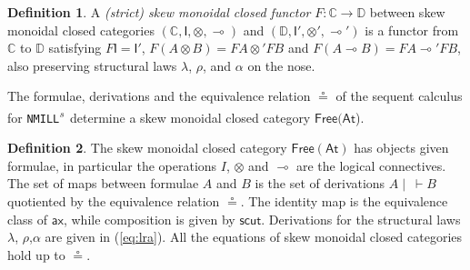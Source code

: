 \documentclass[submission,copyright,creativecommons]{eptcs}
\theoremstyle{definition}
\newtheorem{defn}{Definition}[section]
\newcommand{\ax}{\mathsf{ax}}
\newcommand{\ot}{\otimes}
\newcommand{\lolli}{\multimap}
\newcommand{\I}{\mathsf{I}}
\newcommand{\NMILL}{\texttt{NMILL}}
\newcommand{\SkNMILL}{\NMILL\textsuperscript{\textit{s}}}
\newcommand{\FSkMCC}{\mathsf{Free}}
\begin{document}
\begin{defn}
  A \emph{(strict) skew monoidal closed functor} $F : \mathbb{C} \rightarrow \mathbb{D}$ between skew monoidal closed categories $(\mathbb{C} , \I , \ot , \lolli)$ and $(\mathbb{D} , \I' , \ot' , \lolli')$ is a functor from $\mathbb{C}$ to $\mathbb{D}$ satisfying
    $F \I = \I'$, $F (A \ot B) = F A \ot' F B$ and
    $F(A \lolli B) = F A \lolli' F B$, also preserving  structural laws $\lambda$, $\rho$, and $\alpha$ on the nose.
\end{defn}

The formulae, derivations and the equivalence relation $\circeq$ of the sequent calculus for \SkNMILL\ determine a skew monoidal closed category $\FSkMCC(\mathsf{At}$).
\begin{defn}\label{def:fskmcc}
  The skew monoidal closed category $\FSkMCC(\mathsf{At})$ has
  objects given formulae, in particular the operations $I$, $\ot$ and $\lolli$ are the logical connectives. The set of maps between formulae $A$ and $B$ is the set of derivations $A \mid ~ \vdash B$ quotiented by the equivalence relation $\circeq$. The identity map is the equivalence class of $\ax$, while composition is given by $\mathsf{scut}$. Derivations for the structural laws $\lambda$, $\rho$,$\alpha$ are given in (\ref{eq:lra}). All the equations of skew monoidal closed categories hold up to $\circeq$.
\end{defn}
\end{document}
